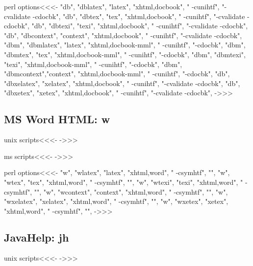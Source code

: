 \documentclass{article}
\begin{document}
\<perl options\><<<-
 "db",  "dblatex",   "latex",   "xhtml,docbook",     " -cunihtf",  "-cvalidate -cdocbk",
 "db",  "dbtex",     "tex",     "xhtml,docbook",     " -cunihtf",  "-cvalidate -cdocbk",
 "db",  "dbtexi",    "texi",    "xhtml,docbook",     " -cunihtf",  "-cvalidate -cdocbk",
 "db",  "dbcontext", "context", "xhtml,docbook",     " -cunihtf",  "-cvalidate -cdocbk",
 "dbm", "dbmlatex",  "latex",   "xhtml,docbook-mml", " -cunihtf",  "-cdocbk",
 "dbm", "dbmtex",    "tex",     "xhtml,docbook-mml", " -cunihtf",  "-cdocbk",
 "dbm", "dbmtexi",   "texi",    "xhtml,docbook-mml", " -cunihtf",  "-cdocbk",
 "dbm", "dbmcontext","context", "xhtml,docbook-mml", " -cunihtf",  "-cdocbk",
 "db",  "dbxelatex",   "xelatex",   "xhtml,docbook",     " -cunihtf",  "-cvalidate -cdocbk",
 "db",  "dbxetex",     "xetex",     "xhtml,docbook",     " -cunihtf",  "-cvalidate -cdocbk",
->>>



\subsection{MS Word HTML: w}


\<unix scripts\><<<-
->>>

\<ms scripts\><<<-
->>>




\<perl options\><<<-
 "w", "wlatex",   "latex",   "xhtml,word", " -csymhtf", "",
 "w", "wtex",     "tex",     "xhtml,word", " -csymhtf", "",
 "w", "wtexi",    "texi",    "xhtml,word", " -csymhtf", "",
 "w", "wcontext", "context", "xhtml,word", " -csymhtf", "",
 "w", "wxelatex",   "xelatex",   "xhtml,word", " -csymhtf", "",
 "w", "wxetex",     "xetex",     "xhtml,word", " -csymhtf", "",
->>>




\subsection{JavaHelp: jh}

\<unix scripts\><<<-
->>>
\end{document}
